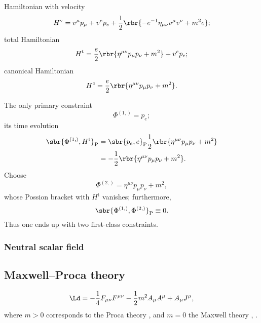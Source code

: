 \documentclass[a4paper,11pt]{article}
\begin{document}
Hamiltonian with velocity
\begin{equation}
H^\text{v} = v^\mu p_\mu + v^e p_e + \frac{1}{2} \rbr{-e^{-1} \eta_{\mu\nu} 
v^\mu v^\nu + m^2 e};
\end{equation}
total Hamiltonian
\begin{equation}
H^\text{t} = \frac{e}{2} \rbr{\eta^{\mu\nu}p_\mu p_\nu + m^2} + v^e p_e;
\end{equation}
canonical Hamiltonian
\begin{equation}
H^\text{c} = \frac{e}{2} \rbr{\eta^{\mu\nu}p_\mu p_\nu + m^2}.
\end{equation}

The only primary constraint
\begin{equation}
\Phi^{(1,)} = p_e;
\end{equation}
its time evolution
\begin{align}
\sbr{\Phi^{(1,)}, H^\text{t}}_\text{P} &=
\sbr{p_e, e}_\text{P}\frac{1}{2}\rbr{\eta^{\mu\nu}p_\mu p_\nu + m^2}
\nonumber \\
&= -\frac{1}{2}\rbr{\eta^{\mu\nu}p_\mu p_\nu + m^2}.
\end{align}
Choose
\begin{equation}
\Phi^{(2,)} = \eta^{\mu\nu}p_\mu p_\nu + m^2,
\end{equation}
whose Possion bracket with $H^\text{t}$ vanishes; furthermore,
\begin{equation}
\sbr{\Phi^{(1,)},\Phi^{(2,)}}_\text{P} \equiv 0.
\end{equation}
Thus one ends up with two first-class constraints.



\subsubsection{Neutral scalar field}
\cite[sec.\ 3.3]{Kiefer2012}

\subsection{Maxwell--Proca theory}

\begin{equation}
\Ld = -\frac{1}{4} F_{\mu\nu} F^{\mu\nu} - \frac{1}{2} m^2 A_\mu A^\mu
+ A_\mu J^\mu,
\end{equation}
where $m > 0$ corresponds to the Proca theory \cite[sec.\ 2.3]{Gitman1990}, and 
$m = 0$ the Maxwell theory \cite[sec.\ 3.3.3]{Rothe2010}, \cite[sec.\ 
2.4]{Gitman1990}.
\end{document}
